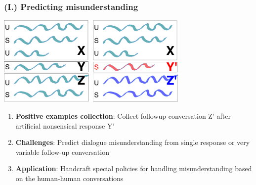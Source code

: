\documentclass[10pt, compress,british,xcolor={svgnames,dvipsnames,x11names},trans]{beamer}
\begin{document}
\begin{frame}\frametitle{(I.) Predicting misunderstanding}
    \begin{center}
    \includegraphics[width=0.7\textwidth]{./misunderstaning}
    \end{center}
    \begin{enumerate}
        \item {\bf Positive examples collection}: Collect followup conversation Z' after artificial nonsensical response Y' \\
        \item {\bf Challenges}: Predict dialogue misunderstanding from single response or very variable follow-up conversation \\ 
        \item {\bf Application}: Handcraft special policies for handling misunderstanding based on the human-human conversations 
    \end{enumerate}
\end{frame}
\end{document}
